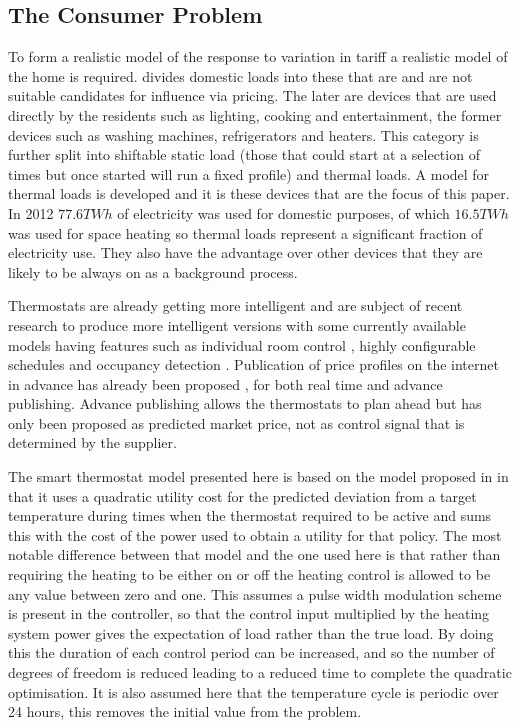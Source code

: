 \documentclass[a4paper, 10 pt, conference]{ieeeconf}  %
\begin{document}


\subsection{The Consumer Problem}
To form a realistic model of the response to variation in tariff a realistic model of the home is required. \cite{ramchurn2011agent} divides domestic loads into these that are and are not suitable candidates for influence via pricing. The later are devices that are used directly by the residents such as lighting, cooking and entertainment, the former devices such as washing machines, refrigerators and heaters. This category is further split into shiftable static load (those that could start at a selection of times but once started will run a fixed profile) and thermal loads. A model for thermal loads is developed and it is these devices that are the focus of this paper. In 2012 $77.6 TWh$ of electricity was used for domestic purposes, of which $16.5 TWh$ was used for space heating \cite{ecuk_data} so thermal loads represent a significant fraction of electricity use. They also have the advantage over other devices that they are likely to be always on as a background process.

Thermostats are already getting more intelligent and are subject of recent research to produce more intelligent versions \cite{rogers2011adaptive} \cite{ramchurn2013agentswitch} with some currently available models having features such as individual room control \cite{honeywell}, highly configurable schedules \cite{nest} and occupancy detection \cite{tado}. Publication of price profiles on the internet in advance has already been proposed \cite{ramchurn2011agenthomeo}, for both real time and advance publishing. Advance publishing allows the thermostats to plan ahead but has only been proposed as predicted market price\cite{rogers2011adaptive}, not as control signal that is determined by the supplier.

The smart thermostat model presented here is based on the model proposed in \cite{rogers2011adaptive} in that it uses a quadratic utility cost for the predicted deviation from a target temperature during times when the thermostat required to be active and sums this with the cost of the power used to obtain a utility for that policy. The most notable difference between that model and the one used here is that rather than requiring the heating to be either on or off the heating control is allowed to be any value between zero and one. This assumes a pulse width modulation scheme is present in the controller, so that the control input multiplied by the heating system power gives the expectation of load rather than the true load. By doing this the duration of each control period can be increased, and so the number of degrees of freedom is reduced leading to a reduced time to complete the quadratic optimisation. It is also assumed here that the temperature cycle is periodic over 24 hours, this removes the initial value from the problem.
\end{document}
